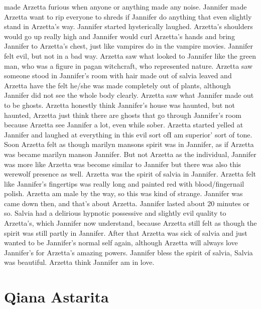 \documentclass[12pt]{book}
\begin{document}
made Arzetta furious when anyone or anything made any noise. Jannifer made Arzetta want to rip everyone to shreds if Jannifer do anything that even slightly stand in Arzetta's way. Jannifer started hysterically laughed. Arzetta's shoulders would go up really high and Jannifer would curl Arzetta's hands and bring Jannifer to Arzetta's chest, just like vampires do in the vampire movies. Jannifer felt evil, but not in a bad way. Arzetta saw what looked to Jannifer like the green man, who was a figure in pagan witchcraft, who represented nature. Arzetta saw someone stood in Jannifer's room with hair made out of salvia leaved and Arzetta have the felt he/she was made completely out of plants, although Jannifer did not see the whole body clearly. Arzetta saw what Jannifer made out to be ghosts. Arzetta honestly think Jannifer's house was haunted, but not haunted, Arzetta just think there are ghosts that go through Jannifer's room because Arzetta see Jannifer a lot, even while sober. Arzetta started yelled at Jannifer and laughed at everything in this evil sort ofI am superior' sort of tone. Soon Arzetta felt as though marilyn mansons spirit was in Jannifer, as if Arzetta was became marilyn manson Jannifer. But not Arzetta as the individual, Jannifer was more like Arzetta was become similar to Jannifer but there was also this werewolf presence as well. Arzetta was the spirit of salvia in Jannifer. Arzetta felt like Jannifer's fingertips was really long and painted red with blood/fingernail polish. Arzetta am male by the way, so this was kind of strange. Jannifer was came down then, and that's about Arzetta. Jannifer lasted about 20 minutes or so. Salvia had a delirious hypnotic possessive and slightly evil quality to Arzetta's, which Jannifer now understand, because Arzetta still felt as though the spirit was still partly in Jannifer. After that Arzetta was sick of salvia and just wanted to be Jannifer's normal self again, although Arzetta will always love Jannifer's for Arzetta's amazing powers. Jannifer bless the spirit of salvia, Salvia was beautiful. Arzetta think Jannifer am in love.



\chapter{Qiana Astarita}
\end{document}
